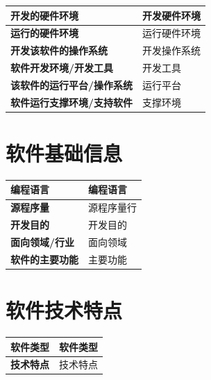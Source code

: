 \documentclass[a4paper,12pt]{article}
\begin{document}
\begin{center}
\begin{tabularx}{\textwidth}{|l|L|}
\hline
\textbf{开发的硬件环境} & {{开发硬件环境}} \\
\hline
\textbf{运行的硬件环境} & {{运行硬件环境}} \\
\hline
\textbf{开发该软件的操作系统} & {{开发操作系统}} \\
\hline
\textbf{软件开发环境/开发工具} & {{开发工具}} \\
\hline
\textbf{该软件的运行平台/操作系统} & {{运行平台}} \\
\hline
\textbf{软件运行支撑环境/支持软件} & {{支撑环境}} \\
\hline
\end{tabularx}
\end{center}


\section{软件基础信息}

\begin{center}
\begin{tabularx}{\textwidth}{|l|L|}
\hline
\textbf{编程语言} & {{编程语言}} \\
\hline
\textbf{源程序量} & {{源程序量}}行 \\
\hline
\textbf{开发目的} & {{开发目的}} \\
\hline
\textbf{面向领域/行业} & {{面向领域}} \\
\hline
\textbf{软件的主要功能} & {{主要功能}} \\
\hline
\end{tabularx}
\end{center}


\section{软件技术特点}

\begin{center}
\begin{tabularx}{\textwidth}{|l|L|}
\hline
\textbf{软件类型} & {{软件类型}} \\
\hline
\textbf{技术特点} & {{技术特点}} \\
\hline
\end{tabularx}
\end{center}
\end{document}
